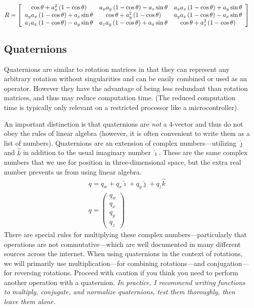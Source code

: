 \documentclass[letterpaper,10pt]{article}
\begin{document}
\begin{equation}
R = \left[\begin{array}{c c c} \cos \theta +a_x^2 \left(1-\cos \theta\right) & a_x a_y \left(1-\cos \theta\right) - a_z \sin \theta & a_x a_z \left(1-\cos \theta\right) + a_y \sin \theta \\
a_y a_x \left(1-\cos \theta\right) + a_z \sin \theta & \cos \theta + a_y^2\left(1-\cos \theta\right) & a_y a_z \left(1-\cos \theta\right) - a_x \sin \theta \\
a_z a_x \left(1-\cos \theta\right) - a_y \sin \theta & a_z a_y \left(1-\cos \theta\right) + a_x \sin \theta & \cos \theta + a_z^2\left(1-\cos \theta\right) 
\end{array}\right]
\end{equation}

\subsection{Quaternions}
Quaternions are similar to rotation matrices in that they can represent any arbitrary rotation without singularities and can be easily combined or used as an operator. However they have the advantage of being less redundant than rotation matrices, and thus may reduce computation time. (The reduced computation time is typically only relevant on a restricted processor like a microcontroller).

An important distinction is that quaternions are \emph{not} a 4-vector and thus do not obey the rules of linear algebra (however, it is often convenient to write them as a list of numbers). Quaternions are an extension of complex numbers---utilizing $\hat{\jmath}$ and $\hat{k}$ in addition to the usual imaginary number $\hat{\imath}$. These are the same complex numbers that we use for position in three-dimensional space, but the extra real number prevents us from using linear algebra.
\begin{gather}
q = q_w + q_x \hat{\imath} + q_y \hat{\jmath} + q_z \hat{k} \\
q = \left(\begin{array}{c}q_w \\ q_x \\ q_y \\ q_z\end{array}\right)
\end{gather}
There are special rules for multiplying these complex numbers---particularly that operations are not commutative---which are well documented in many different sources across the internet. When using quaternions in the context of rotations, we will primarily use multiplication---for combining rotations---and conjugation---for reversing rotations. Proceed with caution if you think you need to perform another operation with a quaternion. \emph{In practice, I recommend writing functions to multiply, conjugate, and normalize quaternions, test them thoroughly, then leave them alone.}
\end{document}
